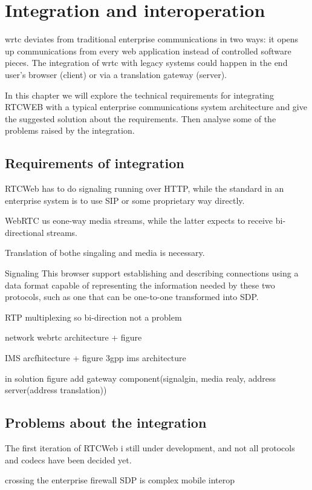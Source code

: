 \section{Integration and interoperation}
\gls{wrtc} deviates from traditional enterprise communications in two ways: it opens up communications from every web application instead of controlled software pieces. The integration of \gls{wrtc} with legacy systems could happen in the end user's browser (client) or via a translation gateway (server).

In this chapter we will explore the technical requirements for integrating RTCWEB with a typical enterprise communications system architecture and give the suggested solution about the requirements. Then analyse some of the problems raised by the integration.

\subsection{Requirements of integration}
RTCWeb has to do signaling running over HTTP, while the standard in an enterprise system is to use SIP or some proprietary way directly.

WebRTC us eone-way media streams, while the latter expects to receive bi-directional streams.

Translation of bothe singaling and media is necessary.

Signaling
This browser support establishing and describing connections using a data format capable of representing the information needed by these two protocols, such as one that can be one-to-one transformed into SDP.

RTP
multiplexing so bi-direction not a problem

network
webrtc architecture + figure

IMS arcfhitecture + figure 3gpp ims architecture

in solution figure add gateway component(signalgin, media realy, address server(address translation))

\subsection{Problems about the integration}
The first iteration of RTCWeb i still under development, and not all protocols and codecs have been decided yet. 

crossing the enterprise firewall
SDP is complex
mobile interop


